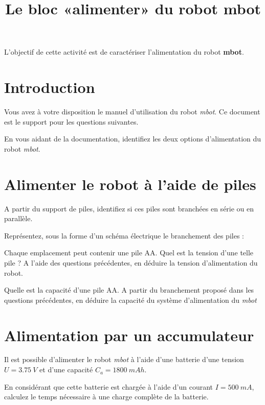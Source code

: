 \documentclass[10pt,fleqn]{article} %
\title{Le bloc «alimenter» du robot mbot}
\date{}
\begin{document}
\maketitle
\chapterimage{}
%
\begin{obj}
  L'objectif de cette activité est de caractériser l'alimentation du robot \textbf{mbot}.
\end{obj}
\section{Introduction}
Vous avez à votre disposition le manuel d'utilisation du robot \textit{mbot}. Ce document est le support pour les questions suivantes.
\begin{question}
  En vous aidant de la documentation, identifiez les deux options d'alimentation du robot \textit{mbot}.
\end{question}
\section{Alimenter le robot à l'aide de piles}
\begin{question}
  A partir du support de piles, identifiez si ces piles sont branchées en série ou en parallèle.
\end{question}
\begin{question}
  Représentez, sous la forme d'un schéma électrique le branchement des piles :
\end{question}

\begin{question}
  Chaque emplacement peut contenir une pile AA. Quel est la tension d'une telle pile ? A l'aide des questions précédentes, en déduire la tension d'alimentation du robot.
\end{question}

\begin{question}
  Quelle est la capacité d'une pile AA. A partir du branchement proposé dans les questions précédentes, en déduire la capacité du système d'alimentation du \textit{mbot}
\end{question}

\pagebreak
\section{Alimentation par un accumulateur}
Il est possible d'alimenter le robot \textit{mbot} à l'aide d'une batterie d'une tension $U=\SI{3,75}{V}$ et d'une capacité $C_a=\SI{1800}{mAh}$.
\begin{question}
  En considérant que cette batterie est chargée à l'aide d'un courant $I=\SI{500}{mA}$, calculez le temps nécessaire à une charge complète de la batterie.
\end{question}
\end{document}
